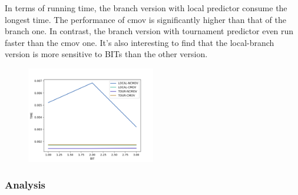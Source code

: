 \documentclass[10pt, a4paper, twocolumn]{article} %
\begin{document}
    In terms of running time, the branch version with local predictor consume 
    the longest time. The performance of cmov is significantly higher than
    that of the branch one.
    In contrast, the branch version with tournament predictor even run faster
    than the cmov one.
    It's also interesting to find that the local-branch version is more sensitive
    to BITs than the other version.
    \begin{figure}[!h]
        \includegraphics[width=0.5\textwidth]{pics/bit-time.png}
    \end{figure}
    \subsubsection{Analysis}

    
    
        
    
    
    
    
\end{document}
